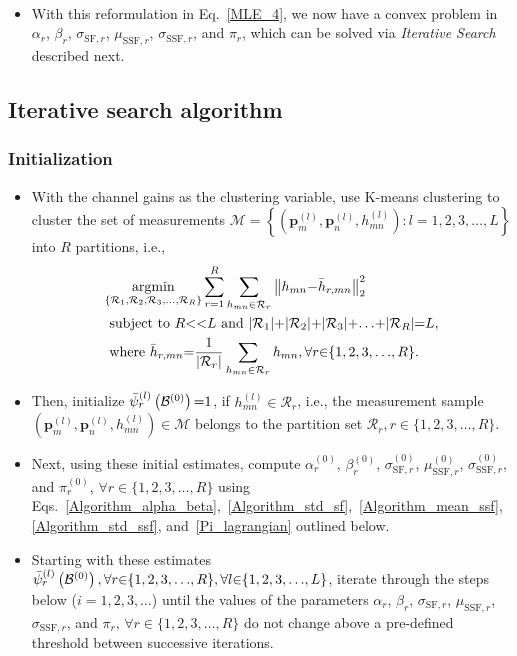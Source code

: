 \documentclass{article}
\newcommand{\norm}[1]{\left\lVert#1\right\rVert}
\begin{document}
\begin{itemize}
\begin{align}
    \end{align}
    \item With this reformulation in Eq.~\eqref{MLE_4}, we now have a convex problem in $\alpha_{r}$, $\beta_{r}$, $\sigma_{\mathrm{SF},r}$, $\mu_{\mathrm{SSF},r}$, $\sigma_{\mathrm{SSF},r}$, and $\pi_{r}$, which can be solved via \emph{Iterative Search} described next.
\end{itemize}

\subsection{Iterative search algorithm}
\subsubsection{Initialization}
\begin{itemize}
    \item With the channel gains as the clustering variable, use K-means clustering to cluster the set of measurements $\mathcal{M}{=}\left\{\left(\mathbf{p}_{m}^{(l)},\mathbf{p}_{n}^{(l)},h_{mn}^{(l)}\right):l{=}1,2,3,{\dots},L\right\}$ into $R$ partitions, i.e.,
    \begin{align}\label{Clustering}
        &\underset{\left\{\mathcal{R}_{1},\mathcal{R}_{2},\mathcal{R}_{3},{\dots},\mathcal{R}_{R}\right\}}{\mathrm{argmin}}\sum_{r{=}1}^{R}\sum_{h_{mn}{\in}\mathcal{R}_{r}}\norm{h_{mn}{-}\Bar{h}_{r,mn}}_{2}^{2}\nonumber\\&\text{ subject to }R{<<}L\text{ and }|\mathcal{R}_{1}|{+}|\mathcal{R}_{2}|{+}|\mathcal{R}_{3}|{+}{\dots}{+}|\mathcal{R}_{R}|{=}L,\nonumber\\&\text{ where }\Bar{h}_{r,mn}{=}\frac{1}{|\mathcal{R}_{r}|}\sum_{h_{mn}{\in}\mathcal{R}_{r}}h_{mn},{\forall}r{\in}\{1,2,3,{\dots},R\}.
    \end{align}
    \item Then, initialize $\Bar{\psi}_{r}^{(l)}\left(\mathcal{B}^{(0)}\right){=}1$, if $h_{mn}^{(l)}{\in}\mathcal{R}_{r}$, i.e., the measurement sample $\left(\mathbf{p}_{m}^{(l)},\mathbf{p}_{n}^{(l)},h_{mn}^{(l)}\right){\in}\mathcal{M}$ belongs to the partition set $\mathcal{R}_{r},r{\in}\{1,2,3,{\dots},R\}$.
    \item Next, using these initial estimates, compute $\alpha_{r}^{(0)}$, $\beta_{r}^{(0)}$, $\sigma_{\mathrm{SF},r}^{(0)}$, $\mu_{\mathrm{SSF},r}^{(0)}$, $\sigma_{\mathrm{SSF},r}^{(0)}$, and $\pi_{r}^{(0)}$, ${\forall}r{\in}\{1,2,3,{\dots},R\}$ using Eqs.~\eqref{Algorithm_alpha_beta},~\eqref{Algorithm_std_sf},~\eqref{Algorithm_mean_ssf},~\eqref{Algorithm_std_ssf}, and~\eqref{Pi_lagrangian} outlined below.
    \item Starting with these estimates $\Bar{\psi}_{r}^{(l)}\left(\mathcal{B}^{(0)}\right),{\forall}r{\in}\{1,2,3,{\dots},R\},{\forall}l{\in}\{1,2,3,{\dots},L\}$, iterate through the steps below ($i{=}1,2,3,{\dots}$) until the values of the parameters $\alpha_{r}$, $\beta_{r}$, $\sigma_{\mathrm{SF},r}$, $\mu_{\mathrm{SSF},r}$, $\sigma_{\mathrm{SSF},r}$, and $\pi_{r}$, ${\forall}r{\in}\{1,2,3,{\dots},R\}$ do not change above a pre-defined threshold between successive iterations.
\end{itemize}
\end{document}
